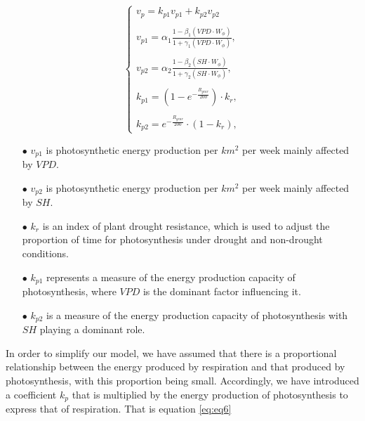 \documentclass[12pt]{article}  %
\newenvironment{shrinkeq}[1]
{ \bgroup
	\addtolength\abovedisplayshortskip{#1}
	\addtolength\abovedisplayskip{#1}
	\addtolength\belowdisplayshortskip{#1}
	\addtolength\belowdisplayskip{#1}}
{\egroup\ignorespacesafterend}
\begin{document}
\begin{shrinkeq}{-1ex}
	\begin{equation}
    \label{eq:eq5}
	   \left\{\begin{array}{l}
    v_{p} = k_{p1}v_{p1}+k_{p2}v_{p2}\\
   \\
    v_{p1}=\alpha_1\frac{1-\beta_1(VPD\cdot W_{\phi})}{1+\gamma_1(VPD\cdot W_\phi)} , \\
    \\
    v_{p2}=\alpha_2\frac{1-\beta_2(SH\cdot W_{\phi})}{1+\gamma_2(SH\cdot W_\phi)} , \\
   \\
    k_{p1} = (1-e^{-\frac{R_{year}}{200}})\cdot k_r,\\
   \\
    k_{p2} = e^{-\frac{R_{year}}{200}}\cdot (1-k_r),
\end{array}\right.
	\end{equation}
\end{shrinkeq}

\vspace{-0.2cm}
\begin{itemize}
\vspace{-0.2cm}
\item[$\bullet$] \textbf{$v_{p1}$ }is photosynthetic energy production per $km^2$ per week mainly affected by $VPD$.
\vspace{-0.2cm}
\item[$\bullet$] \textbf{$v_{p2}$ }is photosynthetic energy production per $km^2$ per week mainly affected by $SH$.
\vspace{-0.2cm}
\item[$\bullet$] \textbf{$k_r$ }is an index of plant drought resistance, which is used to adjust the proportion of time for photosynthesis under drought and non-drought conditions.
\vspace{-0.2cm}
\item[$\bullet$] \textbf{$k_{p1}$ }represents a measure of the energy production capacity of photosynthesis, where $VPD$ is the dominant factor influencing it.
\vspace{-0.2cm}
\item[$\bullet$] \textbf{$k_{p2}$ }is a measure of the energy production capacity of photosynthesis with $SH$ playing a dominant role.
\end{itemize}

\vspace{-0.5cm}
In order to simplify our model, we have assumed that there is a proportional relationship between the energy produced by respiration and that produced by photosynthesis, with this proportion being small. Accordingly, we have introduced a coefficient $k_p$ that is multiplied by the energy production of photosynthesis to express that of respiration. That is equation \eqref{eq:eq6}
\end{document}
